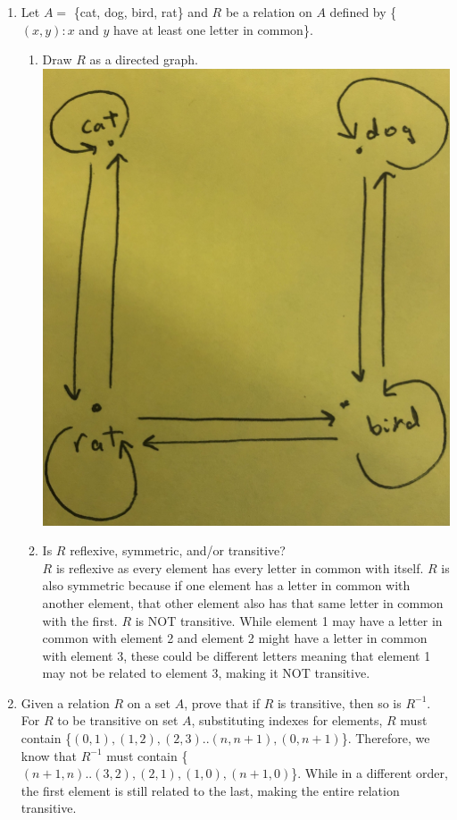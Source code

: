 \documentclass{article}
\begin{document}
\begin{enumerate}
\item Let $ A = $ \{cat, dog, bird, rat\} and $R$ be a relation on $A$ defined by \{$(x,y): x$ and $y$ have at least one letter in common\}. \\
\begin{enumerate}
\item  Draw $R$ as a directed graph. \\
\includegraphics[scale=0.05]{image0.jpg}
\item  Is $R$ reflexive, symmetric, and/or transitive? \\
$R$ is reflexive as every element has every letter in common with itself. $R$ is also symmetric because if one element has a letter in common with another element, that other element also has that same letter in common with the first. $R$ is NOT transitive. While element 1 may have a letter in common with element 2 and element 2 might have a letter in common with element 3, these could be different letters meaning that element 1 may not be related to element 3, making it NOT transitive.
\end{enumerate}

\item Given a relation $R$ on a set $A$, prove that if $R$ is transitive, then so is $R^{-1}$. \\
For $R$ to be transitive on set $A$, substituting indexes for elements, $R$ must contain \{$(0,1),(1,2),(2,3)..(n,n+1),(0,n+1)$\}. Therefore, we know that $R^{-1}$ must contain \{$(n+1,n)..(3,2),(2,1),(1,0),(n+1,0)$\}. While in a different order, the first element is still related to the last, making the entire relation transitive. 


\end{enumerate}
\end{document}
